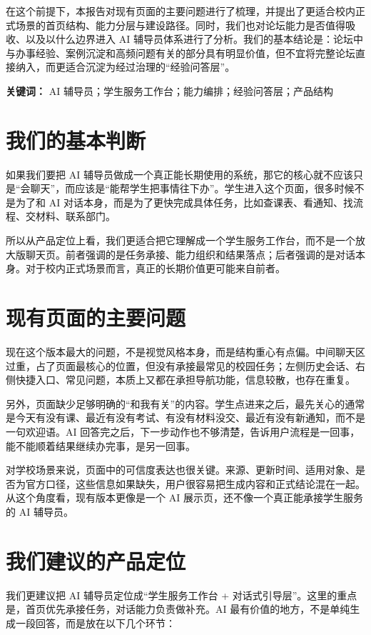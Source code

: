 \documentclass[12pt,a4paper]{ctexart}
\begin{document}
在这个前提下，本报告对现有页面的主要问题进行了梳理，并提出了更适合校内正式场景的首页结构、能力分层与建设路径。同时，我们也对论坛能力是否值得吸收、以及以什么边界进入 AI 辅导员体系进行了分析。我们的基本结论是：论坛中与办事经验、案例沉淀和高频问题有关的部分具有明显价值，但不宜将完整论坛直接纳入，而更适合沉淀为经过治理的“经验问答层”。

\noindent\textbf{关键词：} AI 辅导员；学生服务工作台；能力编排；经验问答层；产品结构

\clearpage
\tableofcontents
\clearpage
{}

\section{我们的基本判断}
如果我们要把 AI 辅导员做成一个真正能长期使用的系统，那它的核心就不应该只是“会聊天”，而应该是“能帮学生把事情往下办”。学生进入这个页面，很多时候不是为了和 AI 对话本身，而是为了更快完成具体任务，比如查课表、看通知、找流程、交材料、联系部门。

所以从产品定位上看，我们更适合把它理解成一个学生服务工作台，而不是一个放大版聊天页。前者强调的是任务承接、能力组织和结果落点；后者强调的是对话本身。对于校内正式场景而言，真正的长期价值更可能来自前者。

\section{现有页面的主要问题}
现在这个版本最大的问题，不是视觉风格本身，而是结构重心有点偏。中间聊天区过重，占了页面最核心的位置，但没有承接最常见的校园任务；左侧历史会话、右侧快捷入口、常见问题，本质上又都在承担导航功能，信息较散，也存在重复。

另外，页面缺少足够明确的“和我有关”的内容。学生点进来之后，最先关心的通常是今天有没有课、最近有没有考试、有没有材料没交、最近有没有新通知，而不是一句欢迎语。AI 回答完之后，下一步动作也不够清楚，告诉用户流程是一回事，能不能顺着结果继续办完事，是另一回事。

对学校场景来说，页面中的可信度表达也很关键。来源、更新时间、适用对象、是否为官方口径，这些信息如果缺失，用户很容易把生成内容和正式结论混在一起。从这个角度看，现有版本更像是一个 AI 展示页，还不像一个真正能承接学生服务的 AI 辅导员。

\section{我们建议的产品定位}
我们更建议把 AI 辅导员定位成“学生服务工作台 + 对话式引导层”。这里的重点是，首页优先承接任务，对话能力负责做补充。AI 最有价值的地方，不是单纯生成一段回答，而是放在以下几个环节：
\end{document}
